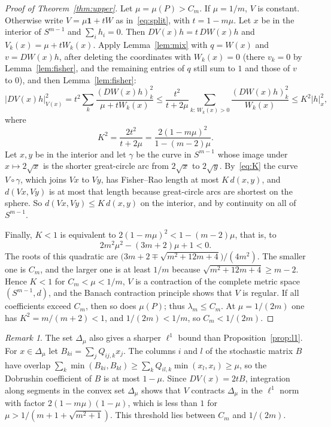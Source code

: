\documentclass[11pt]{amsart}
\theoremstyle{definition}
\theoremstyle{remark}
\newtheorem{remark}[theorem]{Remark}
\newcommand{\one}{\mathbf{1}}
\begin{document}
\begin{proof}[Proof of Theorem~\ref{thm:upper}]
Let $\mu=\mu(P)>C_m$. If $\mu=1/m$, $V$ is constant. Otherwise write $V=\mu\one+tW$ as in~\eqref{eq:split}, with
$t=1-m\mu$. Let $x$ be in the interior of $S^{m-1}$ and $\sum_ih_i=0$. Then $DV(x)h=t\,DW(x)h$ and $V_k(x)=\mu+tW_k(x)$.
Apply Lemma~\ref{lem:mix} with $q=W(x)$ and $v=DW(x)h$, after deleting the coordinates with $W_k(x)=0$ (there $v_k=0$
by Lemma~\ref{lem:fisher}, and the remaining entries of $q$ still sum to $1$ and those of $v$ to $0$), and then
Lemma~\ref{lem:fisher}:
\begin{equation}\label{eq:K}
|DV(x)h|_{V(x)}^2=t^2\sum_k\frac{(DW(x)h)_k^2}{\mu+tW_k(x)}\le\frac{t^2}{t+2\mu}\sum_{k:\,W_k(x)>0}\frac{(DW(x)h)_k^2}{W_k(x)}\le K^2|h|_x^2,
\end{equation}
where
\[
K^2=\frac{2t^2}{t+2\mu}=\frac{2(1-m\mu)^2}{1-(m-2)\mu}.
\]
Let $x,y$ be in the interior and let $\gamma$ be the curve in $S^{m-1}$ whose image under $x\mapsto2\sqrt x$ is the
shorter great-circle arc from $2\sqrt x$ to $2\sqrt y$. By~\eqref{eq:K} the curve $V\circ\gamma$, which joins $Vx$ to
$Vy$, has Fisher--Rao length at most $K\,d(x,y)$, and $d(Vx,Vy)$ is at most that length because great-circle arcs are
shortest on the sphere. So $d(Vx,Vy)\le K\,d(x,y)$ on the interior, and by continuity on all of $S^{m-1}$.

Finally, $K<1$ is equivalent to $2(1-m\mu)^2<1-(m-2)\mu$, that is, to
\[
2m^2\mu^2-(3m+2)\mu+1<0 .
\]
The roots of this quadratic are $\bigl(3m+2\mp\sqrt{m^2+12m+4}\bigr)/(4m^2)$. The smaller one is $C_m$, and the larger
one is at least $1/m$ because $\sqrt{m^2+12m+4}\ge m-2$. Hence $K<1$ for $C_m<\mu<1/m$, $V$ is a contraction of the
complete metric space $(S^{m-1},d)$, and the Banach contraction principle shows that $V$ is regular. If all coefficients
exceed $C_m$, then so does $\mu(P)$; thus $\lambda_m\le C_m$. At $\mu=1/(2m)$ one has $K^2=m/(m+2)<1$, and
$1/(2m)<1/m$, so $C_m<1/(2m)$.
\end{proof}

\begin{remark}\label{rem:l1}
The set $\Delta_\mu$ also gives a sharper $\ell^1$ bound than Proposition~\ref{prop:l1}. For $x\in\Delta_\mu$ let
$B_{ki}=\sum_jQ_{ij,k}x_j$. The columns $i$ and $l$ of the stochastic matrix $B$ have overlap
$\sum_k\min(B_{ki},B_{kl})\ge\sum_kQ_{il,k}\min(x_l,x_i)\ge\mu$, so the Dobrushin coefficient of $B$ is at most $1-\mu$.
Since $DV(x)=2tB$, integration along segments in the convex set $\Delta_\mu$ shows that $V$ contracts $\Delta_\mu$ in the
$\ell^1$ norm with factor $2(1-m\mu)(1-\mu)$, which is less than $1$ for $\mu>1/(m+1+\sqrt{m^2+1})$. This threshold
lies between $C_m$ and $1/(2m)$.
\end{remark}
\end{document}
